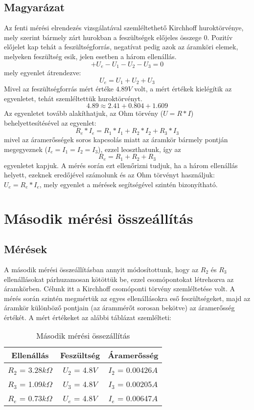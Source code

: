 \documentclass[10pt, conference,a4paper]{ITKproc}
\begin{document}
\subsection{Magyarázat}
Az fenti mérési elrendezés vizsgálatával szemléltethető Kirchhoff huroktörvénye, mely szerint bármely zárt hurokban a feszültségek előjeles összege 0. Pozitív előjelet kap tehát a feszültségforrás, negatívat pedig azok az áramköri elemek, melyeken feszültség esik, jelen esetben a három ellenállás. \[+U_e - U_1 - U_2 - U_3 = 0 \] 
mely egyenlet átrendezve: \[U_e = U_1 + U_2 + U_3\] 
Mivel az feszültségforrás mért értéke $4.89V$ volt, a mért értékek kielégítik az egyenletet, tehát szemléltettük huroktörvényt. \[4.89 \approx 2.41 + 0.804 + 1.609\]
Az egyenletet tovább alakíthatjuk, az Ohm törvény ($U = R * I$) behelyettesítésével az egyenlet: \[R_e*I_e = R_1*I_1 + R_2*I_2 + R_3*I_3\] mivel az áramerősségek soros kapcsolás miatt az áramkör bármely pontján megegyeznek ($I_e = I_1 = I_2 = I_3$), ezzel leoszthatunk, így az \[R_e = R_1 + R_2 + R_3\] egyenletet kapjuk. A mérés során ezt ellenőrizni tudjuk, ha a három ellenállás helyett, ezeknek eredőjével számolunk és az Ohm törvényt használjuk: $U_e = R_e * I_e$, mely egyenlet a mérések segítségével szintén bizonyítható. 

\section{Második mérési összeállítás}
\subsection{Mérések}
A második mérési összeállításban annyit módosítottunk, hogy az $R_2$ és $R_3$ ellenállásokat párhuzamosan kötöttük be, ezzel csomópontokat létrehozva az áramkörben. Célunk itt a Kirchhoff csomóponti törvény szemléltetése volt. A mérés során szintén megmértük az egyes ellenállásokra eső feszültségeket, majd az áramkör különböző pontjain (az árammérőt sorosan bekötve) az áramerősség értékét. A mért értékeket az alábbi táblázat szemlélteti: 

\begin{table}[ht!]
\renewcommand{\arraystretch}{1.3}
\caption{Második mérési össezállítás}
\centering
\begin{tabular}{c||c||c}
\hline
\bfseries Ellenállás & \bfseries Feszültség & \bfseries Áramerősség\\
\hline\hline
 $R_2$ = 3.28$k\Omega$ & $U_2$ = 4.8$V$ & $I_2$ = 0.00426$A$\\
\hline
 $R_3$ = 1.09$k\Omega$ & $U_3$ = 4.8$V$ & $I_3$ = 0.00205$A$ \\
\hline
$R_e$ = 0.73$k\Omega$ & $U_e$ = 4.8$V$ & $I_e$ = 0.00647$A$\\
\hline
\end{tabular}
\end{table}
\end{document}
